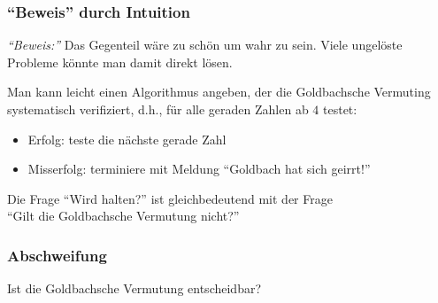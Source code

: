 \documentclass[aspectratio=1610,onlymath]{beamer}
\begin{document}
\begin{frame}[t]\frametitle{"`Beweis"' durch Intuition}

\pause

\emph{"`Beweis:"'} Das Gegenteil wäre zu schön um wahr zu sein. Viele ungelöste Probleme
könnte man damit direkt lösen.\bigskip\pause

\pause

Man kann leicht einen Algorithmus  angeben, der die Goldbachsche Vermuting systematisch verifiziert, d.h., für alle geraden Zahlen ab $4$ testet:
\begin{itemize}
\item Erfolg: teste die nächste gerade Zahl
\item Misserfolg: terminiere mit Meldung "`Goldbach hat sich geirrt!"'
\end{itemize}

Die Frage "`Wird  halten?"' ist gleichbedeutend mit der Frage\\"`Gilt die Goldbachsche Vermutung nicht?"'

\end{frame}

\begin{frame}\frametitle{Abschweifung}

\begin{center}
\large Ist die Goldbachsche Vermutung entscheidbar?
\end{center}

\end{frame}
\end{document}
